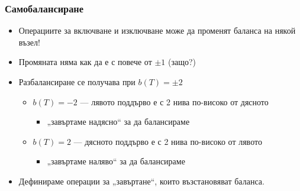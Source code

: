 \documentclass[alsotrans,beameroptions={aspectratio=169}]{beamerswitch}
\begin{document}
\begin{frame}
  \frametitle{Самобалансиране}
  \begin{itemize}[<+->]
  \item Операциите за включване и изключване може да променят баланса на някой възел!
  \item Промяната няма как да е с повече от $\pm 1$ (защо?)
  \item Разбалансиране се получава при $b(T) = \pm 2$
    \begin{itemize}
    \item $b(T) = -2$ --- лявото поддърво е с 2 нива по-високо от дясното
      \begin{itemize}
      \item<7-> „завъртаме надясно“ за да балансираме
      \end{itemize}
    \item $b(T) = 2$ --- дясното поддърво е с 2 нива по-високо от лявото
      \begin{itemize}
      \item<8-> „завъртаме наляво“ за да балансираме
      \end{itemize}
    \end{itemize}
  \item
    Дефинираме операции за „завъртане“, които възстановяват баланса.
  \end{itemize}
\end{frame}
\end{document}
